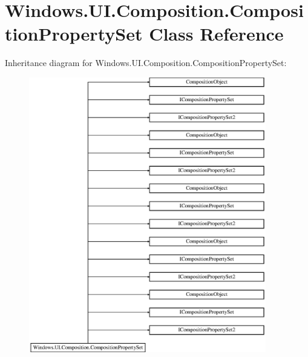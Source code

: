 \hypertarget{class_windows_1_1_u_i_1_1_composition_1_1_composition_property_set}{}\section{Windows.\+U\+I.\+Composition.\+Composition\+Property\+Set Class Reference}
\label{class_windows_1_1_u_i_1_1_composition_1_1_composition_property_set}
Inheritance diagram for Windows.\+U\+I.\+Composition.\+Composition\+Property\+Set\+:\begin{figure}[H]
\begin{center}
\leavevmode
\includegraphics[height=12.000000cm]{class_windows_1_1_u_i_1_1_composition_1_1_composition_property_set}
\end{center}
\end{figure}
